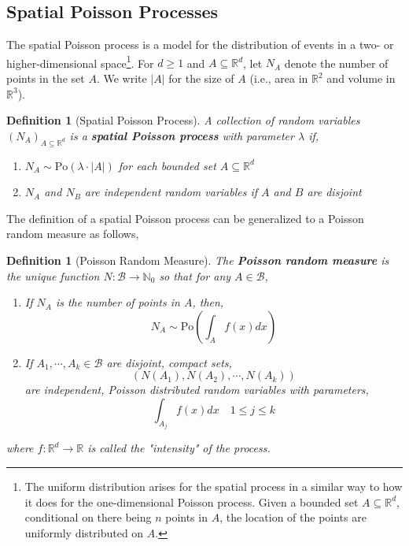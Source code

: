 \documentclass{tufte-handout}
\newtheorem{defn}[thm]{Definition}
\begin{document}
\subsection{Spatial Poisson Processes}
The spatial Poisson process is a model for the distribution of events in a two- or higher-dimensional space\footnote{The uniform distribution arises for the spatial process in a similar way to how it does for the one-dimensional Poisson process. Given a bounded set $A \subseteq \mathbb{R}^d$, conditional on there being $n$ points in $A$, the location of the points are uniformly distributed on $A$.}. For $d \geq 1$ and $A \subseteq \mathbb{R}^d$, let $N_A$ denote the number of points in the set $A$. We write $|A|$ for the size of $A$ (i.e., area in $\mathbb{R}^2$ and volume in $\mathbb{R}^3$).

\begin{defn}[Spatial Poisson Process]
  A collection of random variables $(N_A)_{A \subseteq \mathbb{R}^d}$ is a \textbf{spatial Poisson process} with parameter $\lambda$ if,
  \begin{enumerate}
    \item $N_A \sim \text{Po}(\lambda \cdot |A|)$ for each bounded set $A \subseteq \mathbb{R}^d$
    \item $N_A$ and $N_B$ are independent random variables if $A$ and $B$ are disjoint
  \end{enumerate}
\end{defn}

The definition of a spatial Poisson process can be generalized to a Poisson random measure as follows,
\begin{defn}[Poisson Random Measure]
  The \textbf{Poisson random measure} is the unique function $N: \mathcal{B} \rightarrow \mathbb{N}_0$ so that for any $A \in \mathcal{B}$,
  \begin{enumerate}
    \item If $N_A$ is the number of points in $A$, then,
    \[N_A \sim \text{Po}\left(\int_A f(x) d x\right)\]
    \item If $A_1, \cdots, A_k \in \mathcal{B}$ are disjoint, compact sets,
    \[\left(N(A_1), N(A_2), \cdots, N(A_k)\right)\]
    \noindent are independent, Poisson distributed random variables with parameters,
    \[\int_{A_j} f(x) d x \quad 1 \leq j \leq k\]
  \end{enumerate}
  \noindent where $f: \mathbb{R}^d \rightarrow \mathbb{R}$ is called the "intensity" of the process.
\end{defn}
\end{document}
